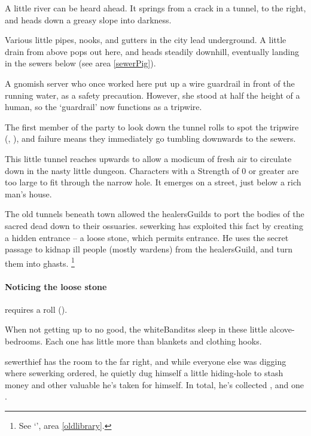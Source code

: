 \begin{boxtext}
  A little river can be heard ahead.
  It springs from a crack in a tunnel, to the right, and heads down a greasy slope into darkness.
\end{boxtext}


Various little pipes, nooks, and gutters in the city lead underground.
A little drain from above pops out here, and heads steadily downhill, eventually landing in the sewers below (see area \vref{sewerPig}).

A gnomish \gls{server} who once worked here put up a wire guardrail in front of the running water, as a safety precaution.
However, she stood at half the height of a human, so the `guardrail' now functions as a tripwire.

The first member of the party to look down the tunnel rolls to spot the tripwire (, \tn[8]), and failure means they immediately go tumbling downwards to the sewers.


This little tunnel reaches upwards to allow a modicum of fresh air to circulate down in the nasty little dungeon.
Characters with a Strength of 0 or greater are too large to fit through the narrow hole.
It emerges on a street, just below a rich man's house.


The old tunnels beneath \gls{town} allowed the \glspl{healersGuild} to port the bodies of the sacred dead down to their ossuaries.
\Gls{sewerking} has exploited this fact by creating a hidden entrance -- a loose stone, which permits entrance.
He uses the secret passage to kidnap ill people (mostly \glspl{warden}) from the \gls{healersGuild}, and turn them into ghasts.%
\footnote{See `', area \vref{oldlibrary}.}

\paragraph{Noticing the loose stone}
requires a  roll (\tn[11]).


When not getting up to no good, the \glspl{whiteBandits} sleep in these little alcove-bedrooms.
Each one has little more than blankets and clothing hooks.

\Gls{sewerthief} has the room to the far right, and while everyone else was digging where \gls{sewerking} ordered, he quietly dug himself a little hiding-hole to stash money and other valuable he's taken for himself.
In total, he's collected \lootMedium, and one \lootMagic.

